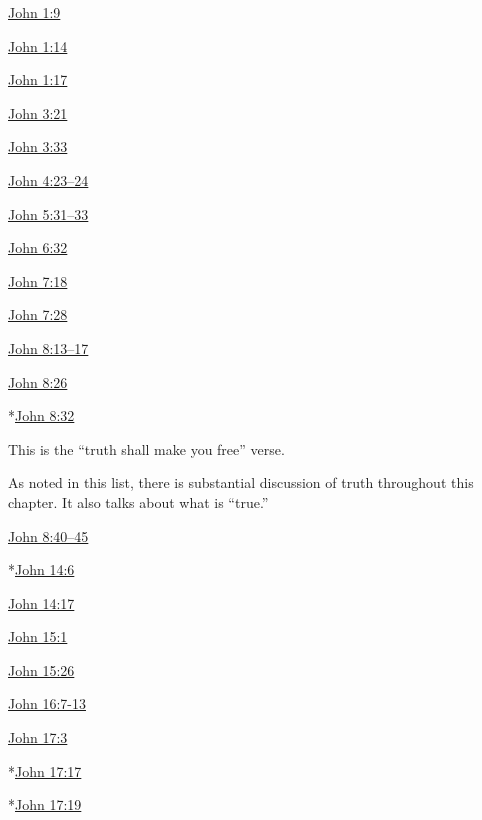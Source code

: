 			\begin{compactdesc}
				\item[{\hyperref[JOHN-1-9]{John 1:9}}]
				\item[{\hyperref[JOHN-1-14]{John 1:14}}]
				\item[{\hyperref[JOHN-1-17]{John 1:17}}]
				\item[{\hyperref[JOHN-3-21]{John 3:21}}]
				\item[{\hyperref[JOHN-3-33]{John 3:33}}]
				\item[{\hyperref[JOHN-4-23]{John 4:23--24}}]
				\item[{\hyperref[JOHN-5-31]{John 5:31--33}}]
				\item[{\hyperref[JOHN-6-32]{John 6:32}}]
				\item[{\hyperref[JOHN-7-18]{John 7:18}}]
				\item[{\hyperref[JOHN-7-28]{John 7:28}}]
				\item[{\hyperref[JOHN-8-13]{John 8:13--17}}]
				\item[{\hyperref[JOHN-8-26]{John 8:26}}]
				\item[*{\hyperref[JOHN-8-32]{John 8:32}}]
					\begin{compactitem}
						\item This is the ``truth shall make you free'' verse.
						\item As noted in this list, there is substantial discussion of truth throughout this chapter. It also talks about what is ``true.''
					\end{compactitem}
				\item[{\hyperref[JOHN-8-40]{John 8:40--45}}]
				\item[*{\hyperref[JOHN-14-6]{John 14:6}}]
				\item[{\hyperref[JOHN-14-17]{John 14:17}}]
				\item[{\hyperref[JOHN-15-1]{John 15:1}}]
				\item[{\hyperref[JOHN-15-26]{John 15:26}}]
				\item[{\hyperref[JOHN-16-7]{John 16:7-13}}]
				\item[{\hyperref[JOHN-17-3]{John 17:3}}]
				\item[*{\hyperref[JOHN-17-17]{John 17:17}}]
				\item[*{\hyperref[JOHN-17-19]{John 17:19}}]
			\end{compactdesc}
			
		
